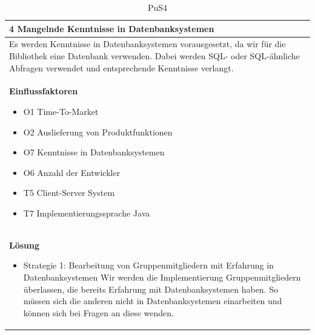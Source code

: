 \documentclass[fontsize=12pt,paper=a4,twoside]{scrartcl}
\begin{document}
\begin{table}[H]
\caption{PuS4}
\begin{tabular}{|p{\textwidth}|}\hline
4 Mangelnde Kenntnisse in Datenbanksystemen\\ \hline
Es werden Kenntnisse in Datenbanksystemen vorausgesetzt, da wir für die Bibliothek eine Datenbank verwenden. Dabei werden SQL- oder SQL-ähnliche Abfragen verwendet und entsprechende Kenntnisse verlangt. \\ \hline
\textbf{Einflussfaktoren}
\begin{itemize}
\item O1 Time-To-Market
\item O2 Auslieferung von Produktfunktionen
\item O7 Kenntnisse in Datenbanksystemen
\item O6 Anzahl der Entwickler
\item T5 Client-Server System
\item T7 Implementierungssprache Java
\end{itemize}\\ \hline
\textbf{Lösung}
\begin{itemize}
\item Strategie 1: Bearbeitung von Gruppenmitgliedern mit Erfahrung in Datenbanksystemen \leavevmode\newline
Wir werden die Implementierung Gruppenmitgliedern überlassen, die bereits Erfahrung mit Datenbanksystemen haben. So müssen sich die anderen nicht in Datenbanksystemen einarbeiten und können sich bei Fragen an diese wenden.
\end{itemize}\\ \hline
\end{tabular}
\end{table}
\end{document}
